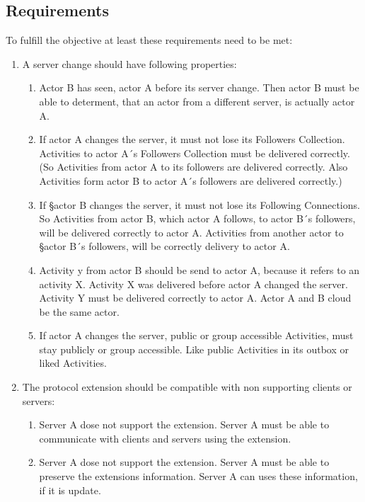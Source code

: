 \documentclass[conference]{IEEEtran}
\begin{document}
\subsection{Requirements}
To fulfill the objective at least these requirements need to be met:
\begin{enumerate}
	\item {
        A server change should have following properties:
        \begin{enumerate}
            \item {Actor B has seen, actor A before its server change. Then actor B must be able to determent, that an actor from a different server, is actually actor A.}
            \item {If actor A changes the server, it must not lose its Followers Collection. Activities to actor A´s Followers Collection must be delivered correctly. (So Activities from actor A to its followers are delivered correctly. Also Activities form actor B to actor A´s followers are delivered correctly.)}
            \item {If §actor B changes the server, it must not lose its Following Connections. So Activities from actor B, which actor A follows, to actor B´s followers, will be delivered correctly to actor A. Activities from another actor to §actor B´s followers, will be correctly delivery to actor A.}
            \item {Activity y from actor B should be send to actor A, because it refers to an activity X. Activity X was delivered before actor A changed the server. Activity Y must be delivered correctly to actor A. Actor A and B cloud be the same actor.}
            \item {If actor A changes the server, public or group accessible Activities, must stay publicly or group accessible. Like public Activities in its outbox or liked Activities.}
        \end{enumerate}
    }
    \item {
        The protocol extension should be compatible with non supporting clients or servers:
        \begin{enumerate}
            \item {Server A dose not support the extension. Server A must be able to communicate with clients and servers using the extension.}
            \item {Server A dose not support the extension. Server A must be able to preserve the extensions information. Server A can uses these information, if it is update.}

\end{enumerate}}
\end{enumerate}
\end{document}
